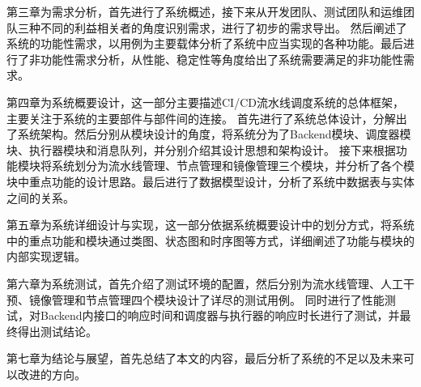 第三章为需求分析，首先进行了系统概述，接下来从开发团队、测试团队和运维团队三种不同的利益相关者的角度识别需求，进行了初步的需求导出。
然后阐述了系统的功能性需求，以用例为主要载体分析了系统中应当实现的各种功能。最后进行了非功能性需求分析，从性能、稳定性等角度给出了系统需要满足的非功能性需求。

第四章为系统概要设计，这一部分主要描述CI/CD流水线调度系统的总体框架，主要关注于系统的主要部件与部件间的连接。
首先进行了系统总体设计，分解出了系统架构。然后分别从模块设计的角度，将系统分为了Backend模块、调度器模块、执行器模块和消息队列，并分别介绍其设计思想和架构设计。
接下来根据功能模块将系统划分为流水线管理、节点管理和镜像管理三个模块，并分析了各个模块中重点功能的设计思路。最后进行了数据模型设计，分析了系统中数据表与实体之间的关系。

第五章为系统详细设计与实现，这一部分依据系统概要设计中的划分方式，将系统中的重点功能和模块通过类图、状态图和时序图等方式，详细阐述了功能与模块的内部实现逻辑。

第六章为系统测试，首先介绍了测试环境的配置，然后分别为流水线管理、人工干预、镜像管理和节点管理四个模块设计了详尽的测试用例。
同时进行了性能测试，对Backend内接口的响应时间和调度器与执行器的响应时长进行了测试，并最终得出测试结论。

第七章为结论与展望，首先总结了本文的内容，最后分析了系统的不足以及未来可以改进的方向。